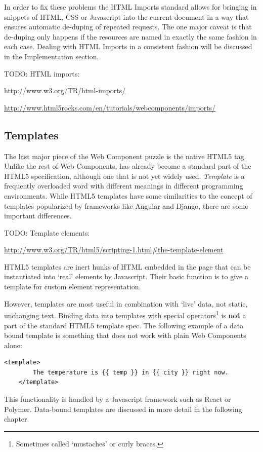 In order to fix these problems the HTML Imports standard allows for bringing in snippets of HTML, CSS or Javascript into the current document in a way that ensures automatic de-duping of repeated requests.
The one major caveat is that de-duping only happens if the resources are named in exactly the same fashion in each case.
Dealing with HTML Imports in a consistent fashion will be discussed in the Implementation section.

TODO: HTML imports:

\url{http://www.w3.org/TR/html-imports/}

\url{http://www.html5rocks.com/en/tutorials/webcomponents/imports/}


\subsection{Templates}
The last major piece of the Web Component puzzle is the native HTML5  tag. 
Unlike the rest of Web Components,  has already become a standard part of the HTML5 specification, although one that is not yet widely used.
\textit{Template} is a frequently overloaded word with different meanings in different programming environments.
While HTML5 templates have some similarities to the concept of templates popularized by frameworks like Angular and Django, there are some important differences.

TODO: Template elements:

\url{http://www.w3.org/TR/html5/scripting-1.html#the-template-element}

HTML5 templates are inert hunks of HTML embedded in the page that can be instantiated into `real' elements by Javascript.
Their basic function is to give a template for custom element representation.

However, templates are most useful in combination with `live' data, not static, unchanging text.
Binding data into templates with special operators\footnote{
Sometimes called `mustaches' or curly braces. }
is \textbf{not} a part of the standard HTML5 template spec.
The following example of a data bound template is something that does not work with plain Web Components alone:

\begin{lstlisting}[language=HTML5,numbers=none]
	<template> 
		The temperature is {{ temp }} in {{ city }} right now.
	</template>
\end{lstlisting}

This functionality is handled by a Javascript framework such as React or Polymer.
Data-bound templates are discussed in more detail in the following chapter.

